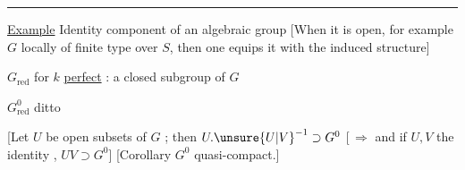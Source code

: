 \par\noindent\rule{.94\linewidth}{.4pt}\par
\uline{Example} Identity component  of an algebraic group \deleted{[it is quasi-compact} [When it is open, for example $G$ locally of finite type over $S$, then one equips it with the induced structure]

$G_{\mathrm{red}}$ for $k$ \uline{perfect} : a closed subgroup of $G$

$G^{0}_{\mathrm{red}}$ ditto

[Let $U$   be open subsets of $G$ ; then $U.\unsure{U|V}^{-1}\supset G^0$ [\,$\Rightarrow$ and if $U,V$  the identity , $UV\supset G^0$] [Corollary $G^0$ quasi-compact.]

